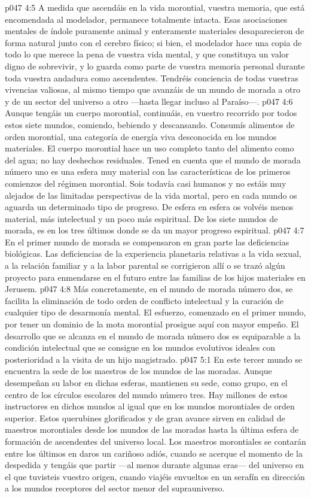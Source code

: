 \vs p047 4:5 A medida que ascendáis en la vida morontial, vuestra memoria, que está encomendada al modelador, permanece totalmente intacta. Esas asociaciones mentales de índole puramente animal y enteramente materiales desaparecieron de forma natural junto con el cerebro físico; si bien, el modelador hace una copia de todo lo que merece la pena de vuestra vida mental, y que constituya un valor digno de sobrevivir, y lo guarda como parte de vuestra memoria personal durante toda vuestra andadura como ascendentes. Tendréis conciencia de todas vuestras vivencias valiosas, al mismo tiempo que avanzáis de un mundo de morada a otro y de un sector del universo a otro ---hasta llegar incluso al Paraíso---.
\vs p047 4:6 Aunque tengáis un cuerpo morontial, continuáis, en vuestro recorrido por todos estos siete mundos, comiendo, bebiendo y descansando. Consumís alimentos de orden morontial, una categoría de energía viva desconocida en los mundos materiales. El cuerpo morontial hace un uso completo tanto del alimento como del agua; no hay deshechos residuales. Tened en cuenta que el mundo de morada número uno es una esfera muy material con las características de los primeros comienzos del régimen morontial. Sois todavía casi humanos y no estáis muy alejados de las limitadas perspectivas de la vida mortal, pero en cada mundo os aguarda un determinado tipo de progreso. De esfera en esfera os volvéis menos material, más intelectual y un poco más espiritual. De los siete mundos de morada, es en los tres últimos donde se da un mayor progreso espiritual.
\vs p047 4:7 En el primer mundo de morada se compensaron en gran parte las deficiencias biológicas. Las deficiencias de la experiencia planetaria relativas a la vida sexual, a la relación familiar y a la labor parental se corrigieron allí o se trazó algún proyecto para enmendarse en el futuro entre las familias de los hijos materiales en Jerusem.
\vs p047 4:8 Más concretamente, en el mundo de morada número dos, se facilita la eliminación de todo orden de conflicto intelectual y la curación de cualquier tipo de desarmonía mental. El esfuerzo, comenzado en el primer mundo, por tener un dominio de la mota morontial prosigue aquí con mayor empeño. El desarrollo que se alcanza en el mundo de morada número dos es equiparable a la condición intelectual que se consigue en los mundos evolutivos ideales con posterioridad a la visita de un hijo magistrado.
\vs p047 5:1 En este tercer mundo se encuentra la sede de los maestros de los mundos de las moradas. Aunque desempeñan su labor en dichas esferas, mantienen su sede, como grupo, en el centro de los círculos escolares del mundo número tres. Hay millones de estos instructores en dichos mundos al igual que en los mundos morontiales de orden superior. Estos querubines glorificados y de gran avance sirven en calidad de maestros morontiales desde los mundos de las moradas hasta la última esfera de formación de ascendentes del universo local. Los maestros morontiales se contarán entre los últimos en daros un cariñoso adiós, cuando se acerque el momento de la despedida y tengáis que partir ---al menos durante algunas eras--- del universo en el que tuvisteis vuestro origen, cuando viajéis envueltos en un serafín en dirección a los mundos receptores del sector menor del suprauniverso.

